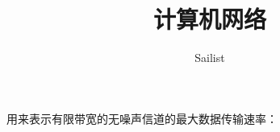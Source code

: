 \documentclass{article}
\title{计算机网络}
\author{Sailist}
\begin{document}
    用来表示有限带宽的无噪声信道的最大数据传输速率：
    
    
    
\end{document}
